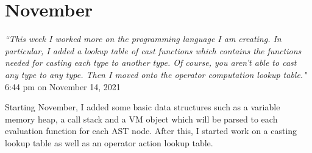 \documentclass[]{interim}
\theoremstyle{definition}
\begin{document}
\section{November}

\begin{center}
    \textit{``This week I worked more on the programming language I am creating. In particular, I added a lookup table of cast functions which contains the functions needed for casting each type to another type. Of course, you aren’t able to cast any type to any type. Then I moved onto the operator computation lookup table."}\\[0.5em]
    \tiny{6:44 pm on November 14, 2021}
\end{center}

Starting November, I added some basic data structures such as a variable memory heap, a call stack and a VM object which will be parsed to each evaluation function for each AST node. After this, I started work on a casting lookup table as well as an operator action lookup table.

\newpage
\label{endpage}
\printbibliography
\end{document}
